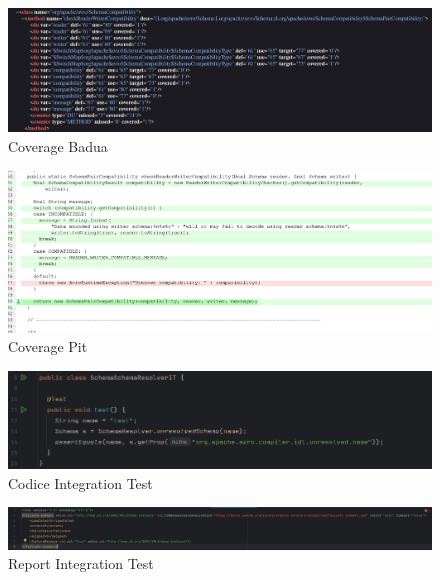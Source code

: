 \documentclass[12pt, a4paper]{article}
\begin{document}
  \begin{figure}
    \includegraphics[width=\linewidth]{./images/schema_compatibiity/BaduaCoverage1.png}
    \caption{Coverage Badua}
    \label{fig:BaduaCoverageSchemaCompatibility1}
  \end{figure}

  \begin{figure}
    \includegraphics[width=\linewidth]{./images/schema_compatibiity/PitCoverage1.png}
    \caption{Coverage Pit}
    \label{fig:PitMutationSchemaCompatibility1}
  \end{figure}

  \begin{figure}
    \includegraphics[width=\linewidth]{./images/integration_test/IntegrationTest.png}
    \caption{Codice Integration Test}
    \label{fig:CodeIntegrationTest}
  \end{figure}

  \begin{figure}
    \includegraphics[width=\linewidth]{./images/integration_test/FailsafeReport.png}
    \caption{Report Integration Test}
    \label{fig:ReportIntegrationTest}
  \end{figure}

  
\end{document}
